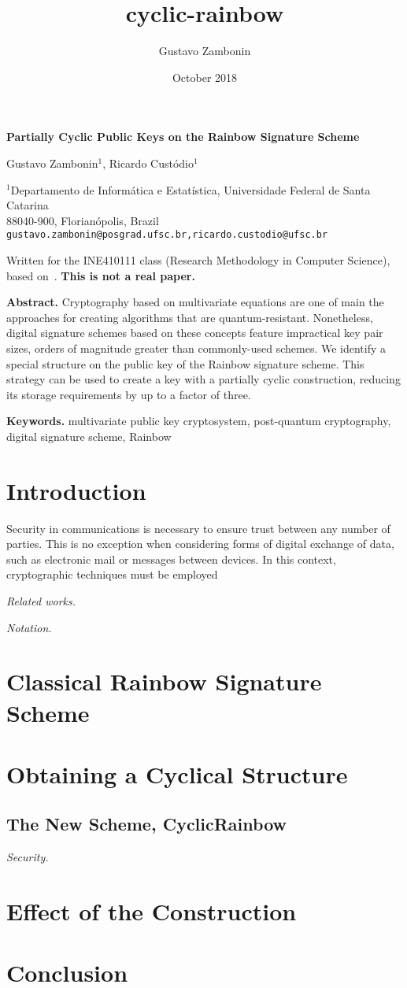 \documentclass[a4paper, 14pt]{extarticle}
\title{cyclic-rainbow}
\author{Gustavo Zambonin}
\date{October 2018}
\begin{document}
\begin{center}
    {\Large\bf Partially Cyclic Public Keys on the Rainbow Signature Scheme} \vspace{.75cm}
    
    Gustavo Zambonin$^{1}$, Ricardo Custódio$^{1}$
    
    $^{1}$Departamento de Informática e Estatística, Universidade Federal de Santa Catarina \\
    88040-900, Florianópolis, Brazil \\
    \texttt{gustavo.zambonin@posgrad.ufsc.br,ricardo.custodio@ufsc.br}
    
     Written for the INE410111 class (Research Methodology in Computer Science), based on~\cite{petzoldt2013selecting}. \textbf{This is not a real paper.} \vspace{.75cm}
\end{center}

\textbf{Abstract.} Cryptography based on multivariate equations are one of main the approaches for creating algorithms that are quantum-resistant. Nonetheless, digital signature schemes based on these concepts feature impractical key pair sizes, orders of magnitude greater than commonly-used schemes. We identify a special structure on the public key of the Rainbow signature scheme. This strategy can be used to create a key with a partially cyclic construction, reducing its storage requirements by up to a factor of three.

\textbf{Keywords.} multivariate public key cryptosystem, post-quantum cryptography, digital signature scheme, Rainbow

\section{Introduction}

Security in communications is necessary to ensure trust between any number of parties. This is no exception when considering forms of digital exchange of data, such as electronic mail or messages between devices. In this context, cryptographic techniques must be employed

\emph{Related works.}

\emph{Notation.}

\section{Classical Rainbow Signature Scheme}

\section{Obtaining a Cyclical Structure}

\subsection{The New Scheme, CyclicRainbow}

\emph{Security.}

\section{Effect of the Construction}

\section{Conclusion}


{\small
}
\end{document}
